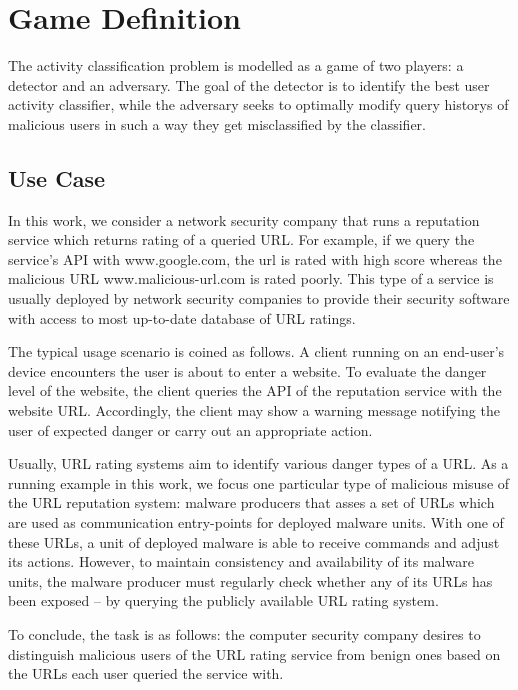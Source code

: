 \section{Game Definition}
The activity classification problem is modelled as a game
of two players: a detector and an adversary. The goal of the detector is
to identify the best user activity classifier, while the adversary seeks
to optimally modify query historys of malicious users in such a way they
get misclassified by the classifier.


\subsection{Use Case}


In this work, we consider a network security company that runs a reputation
service which returns rating of a queried URL. For example, if we query the service's API with \textsf{www.google.com}, the url is rated with high score whereas the malicious URL \textsf{www.malicious-url.com} is rated poorly. This type of a service is usually deployed by network security companies to provide their security software with access to most up-to-date database of URL ratings.

The typical usage scenario is coined as follows. A client running on an
end-user’s device encounters the user is about to enter a website. To
evaluate the danger level of the website, the client queries the API of the reputation service with the website URL. Accordingly, the client may show a warning message notifying the user of expected danger or carry out an
appropriate action.

Usually, URL rating systems aim to identify various danger types of a
URL. As a running example in this work, we focus one particular type of malicious misuse of the URL reputation system: malware producers that asses a set of URLs which are used as communication entry-points for deployed malware
units. With one of these URLs, a unit of deployed malware is able to
receive commands and adjust its actions. However, to maintain
consistency and availability of its malware units, the malware producer
must regularly check whether any of its URLs has been exposed – by
querying the publicly available URL rating system.

To conclude, the task is as follows: the computer security company desires to
distinguish malicious users of the URL rating service from benign ones based on the URLs each user queried the service with.

